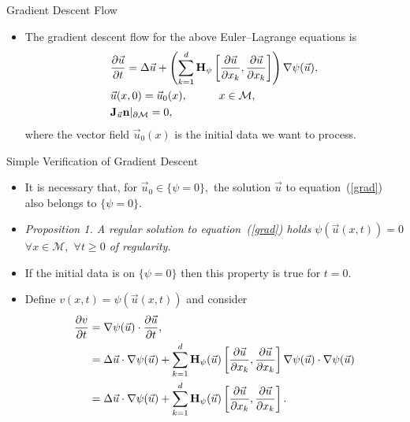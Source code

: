 \documentclass{beamer}
\begin{document}
\begin{frame}{Gradient Descent Flow}
  \begin{itemize}
\item The gradient descent flow for the above Euler--Lagrange equations is
\begin{equation}
\begin{aligned}
&\frac{\partial \vec{u}}{\partial t} = \Delta \vec{u} + \left( \sum_{k=1}^d {\bf H}_{\psi} \left[\frac{\partial \vec{u}}{\partial x_k} ,\frac{\partial \vec{u}}{\partial x_k}\right] \right) \nabla \psi(\vec{u}),\\
&\vec{u}(x,0) = \vec{u}_0(x), \hspace{1cm} x \in \mathcal{M},\\
&{\bf J}_{\vec{u}} {\bf n} |_{\partial \mathcal{M}} = 0,
\end{aligned}
\label{grad}
\end{equation}
where the vector field $\vec{u}_0(x)$ is the initial data we want to process.
\end{itemize}
\end{frame}


\begin{frame}{Simple Verification of Gradient Descent}
  \begin{itemize}
\item It is necessary that, for $\vec{u}_0 \in \{\psi = 0\},$ the solution $\vec{u}$ to equation~(\ref{grad})  also belongs to $\{\psi = 0\}.$
\item {\it  Proposition 1.  A regular solution to equation~(\ref{grad}) holds $\psi (\vec{u} (x,t)) = 0$ $\forall x \in \mathcal{M},$ $\forall t \geq 0 $ of regularity.}
\item If the initial data is on $\{ \psi = 0\}$ then this property is true for $t=0.$
\item Define $v(x,t) = \psi(\vec{u}(x,t))$ and consider
\begin{align*}
\frac{\partial v}{\partial t} &= \nabla \psi (\vec{u}) \cdot \frac{\partial \vec{u}}{\partial t},\\
& = \Delta \vec{u} \cdot \nabla \psi (\vec{u}) + \sum_{k=1}^d {\bf H}_{\psi} (\vec{u}) \left[\frac{\partial \vec{u}}{\partial x_k},\frac{\partial \vec{u}}{\partial x_k}\right] \nabla \psi (\vec{u}) \cdot \nabla \psi (\vec{u}) \\
& =  \Delta \vec{u} \cdot \nabla \psi (\vec{u}) + \sum_{k=1}^d {\bf H}_{\psi} (\vec{u}) \left[\frac{\partial \vec{u}}{\partial x_k},\frac{\partial \vec{u}}{\partial x_k}\right].
\end{align*}
\end{itemize}
\end{frame}
\end{document}
